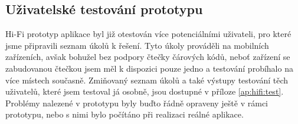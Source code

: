 
\subsection{Uživatelské testování prototypu}

Hi-Fi prototyp aplikace byl již otestován více potenciálními uživateli, pro které jsme připravili seznam úkolů k řešení. Tyto úkoly prováděli na mobilních zařízeních, avšak bohužel bez podpory čtečky čárových kódů, neboť zařízení se zabudovanou čtečkou jsem měl k dispozici pouze jedno a testování probíhalo na více místech současně. Zmiňovaný seznam úkolů a také výstupy testování těch uživatelů, které jsem testoval já osobně, jsou dostupné v příloze \ref{ap:hifi:test}. Problémy nalezené v prototypu byly buďto řádně opraveny ještě v rámci prototypu, nebo s nimi bylo počítáno při realizaci reálné aplikace.
